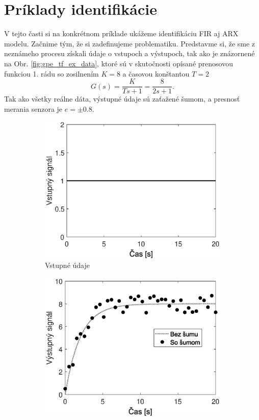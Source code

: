 \section{Príklady identifikácie}
V tejto časti si na konkrétnom príklade ukážeme identifikáciu FIR aj ARX modelu. Začnime tým, že si zadefinujeme problematiku. Predstavme si, že sme z neznámeho procesu získali údaje o vstupoch a výstupoch, tak ako je znázornené na Obr. \ref{fig:gpe_tf_ex_data}, ktoré sú v skutočnosti opísané prenosovou funkciou 1. rádu so zosilnením $ K = 8 $ a časovou konštantou $ T = 2 $
\begin{equation*}
	G(s) = \frac{K}{Ts + 1} = \frac{8}{2s + 1}.
\end{equation*}
Tak ako všetky reálne dáta, výstupné údaje sú zaťažené šumom, a presnosť merania senzora je $ e = \pm 0.8 $. 
\begin{figure}
	\centering
	\begin{subfigure}[b]{0.48\textwidth}
		\centering
		\includegraphics[width=\linewidth]{images/gpe_tf_ex_input}
		\caption{Vstupné údaje}
	\end{subfigure}
	\begin{subfigure}[b]{0.48\textwidth}
		\centering
		\includegraphics[width=\linewidth]{images/gpe_tf_ex_output}

\end{subfigure}
\end{figure}
